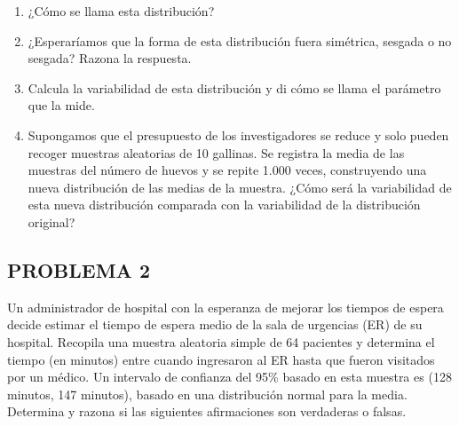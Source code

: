 \documentclass[
]{article}
\providecommand{\tightlist}{%
  \setlength{\itemsep}{0pt}\setlength{\parskip}{0pt}}
\begin{document}
\begin{enumerate}
\def\labelenumi{\alph{enumi})}
\tightlist
\item
  ¿Cómo se llama esta distribución?\\
\item
  ¿Esperaríamos que la forma de esta distribución fuera simétrica, sesgada o no sesgada? Razona la respuesta.\\
\item
  Calcula la variabilidad de esta distribución y di cómo se llama el parámetro que la mide.\\
\item
  Supongamos que el presupuesto de los investigadores se reduce y solo pueden recoger muestras aleatorias de 10 gallinas. Se registra la media de las muestras del número de huevos y se repite 1.000 veces, construyendo una nueva distribución de las medias de la muestra. ¿Cómo será la variabilidad de esta nueva distribución comparada con la variabilidad de la distribución original?
\end{enumerate}

\subsection{PROBLEMA 2}\label{problema-2-1}

Un administrador de hospital con la esperanza de mejorar los tiempos de espera decide estimar el tiempo de espera medio de la sala de urgencias (ER) de su hospital. Recopila una muestra aleatoria simple de 64 pacientes y determina el tiempo (en minutos) entre cuando ingresaron al ER hasta que fueron visitados por un médico. Un intervalo de confianza del 95\% basado en esta muestra es (128 minutos, 147 minutos), basado en una distribución normal para la media. Determina y razona si las siguientes afirmaciones son verdaderas o falsas.
\end{document}
